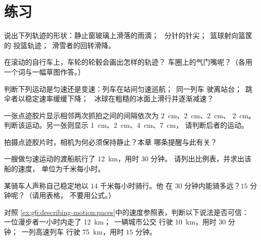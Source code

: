 \section{练习}

\begin{exercise}[$\star$]\label{exo:g6:describing-motion:1}
说出下列轨迹的形状：静止窗玻璃上滑落的雨滴；
\ 分针的针尖；\ 篮球射向篮筐的
投篮轨迹；\ 滑雪者的回转滑降。
\end{exercise}

\begin{exercise}[$\star$]\label{exo:g6:describing-motion:2}
在滚动的自行车上，车轮的轮毂会画出怎样的轨迹？
车圈上的气门嘴呢？（各用一个词与一幅草图作答。）
\end{exercise}

\begin{exercise}[$\star$]\label{exo:g6:describing-motion:3}
判断下列运动是匀速还是变速：列车在站间匀速巡航；\ 同一列车
驶离站台；\ 跳伞者以稳定速率缓缓下降；
\ 冰球在粗糙的冰面上滑行并逐渐减速？
\end{exercise}

\begin{exercise}[$\star$]\label{exo:g6:describing-motion:4}
一张点迹胶片显示相邻两次抓拍之间的间隔依次为 \qty{2}{cm}、\qty{2}{cm}、\qty{2}{cm}、
\qty{2}{cm}。判断该运动。另一张则显示
\qty{1}{cm}、\qty{2}{cm}、\qty{4}{cm}、\qty{7}{cm}，
请判断后者的运动。
\end{exercise}

\begin{exercise}[$\star$]\label{exo:g6:describing-motion:5}
拍摄点迹胶片时，相机为何必须保持静止？本章
哪条提醒与此有关？
\end{exercise}

\begin{exercise}[$\star$]\label{exo:g6:describing-motion:6}
一艘做匀速运动的渡船航行了 \qty{12}{km}，用时 $30$ 分钟。
请列出比例表，并求出该船的速度，
单位为千米每小时。
\end{exercise}

\begin{exercise}[$\star$]\label{exo:g6:describing-motion:7}
某骑车人声称自己稳定地以 $14$ 千米每小时骑行。他
在 $30$ 分钟内能骑多远？$15$ 分钟呢？（请用表格，
不要用公式。）
\end{exercise}

\begin{exercise}[$\star$]\label{exo:g6:describing-motion:8}
对照
\cref{ex:g6:describing-motion:paces}中的速度参照表，判断以下说法是否可信：
一位漫步者一小时内走了 \qty{12}{km}；\ 一辆城市公交
行驶 \qty{10}{km}，用时 $30$ 分钟；\ 一列高速列车
行驶 \qty{75}{km}，用时 $15$ 分钟。
\end{exercise}

